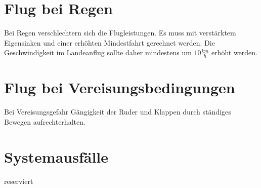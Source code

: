\section{Flug bei Regen}
Bei Regen verschlechtern sich die Flugleistungen. Es muss mit verstärktem Eigensinken und einer erhöhten Mindestfahrt gerechnet werden. Die Geschwindigkeit im Landeanflug sollte daher mindestens um $10 \frac{km}{h}$ erhöht werden.

\section{Flug bei Vereisungsbedingungen}
Bei Vereisungsgefahr Gängigkeit der Ruder und Klappen durch ständiges Bewegen aufrechterhalten.
\newpage
\section{Systemausfälle}
reserviert
